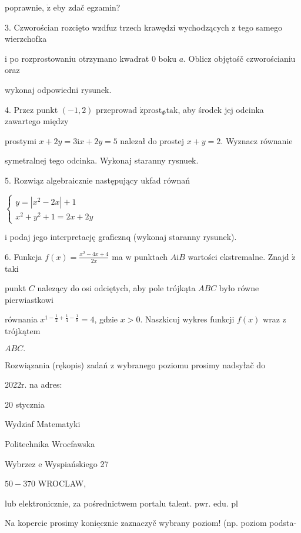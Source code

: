 \documentclass[a4paper,12pt]{article}
\begin{document}
poprawnie, $\dot{\mathrm{z}}$ eby zdač egzamin?

3. Czworościan rozcięto wzdfuz trzech krawędzi wychodzących $\mathrm{z}$ tego samego wierzchofka

$\mathrm{i}$ po rozprostowaniu otrzymano kwadrat $0$ boku $a$. Oblicz objętośč czworościaniu oraz

wykonaj odpowiedni rysunek.

4. Przez punkt $(-1,2)$ przeprowad $\acute{\mathrm{z}} \mathrm{p}\mathrm{r}\mathrm{o}\mathrm{s}\mathrm{t}_{\Phi}\mathrm{t}\mathrm{a}\mathrm{k}$, aby środek jej odcinka zawartego między

prostymi $x+2y = 3\mathrm{i}x+2y = 5$ nalezał do prostej $x+y = 2$. Wyznacz równanie

symetralnej tego odcinka. Wykonaj staranny rysnuek.

5. Rozwiąz algebraicznie następujący ukfad równań

$\left\{\begin{array}{l}
y=|x^{2}-2x|+1\\
x^{2}+y^{2}+1=2x+2y
\end{array}\right.$

$\mathrm{i}$ podaj jego interpretację graficznq (wykonaj staranny rysunek).

6. Funkcja $f(x) = \displaystyle \frac{x^{2}-4x+4}{2x}$ ma $\mathrm{w}$ punktach $A\mathrm{i}B$ wartości ekstremalne. Znajd $\acute{\mathrm{z}}$ taki

punkt $C$ nalezący do osi odciętych, aby pole trójkąta $ABC$ było równe pierwiastkowi

równania $x^{1-\frac{1}{2}+\frac{1}{4}-\frac{1}{8}} =4$, gdzie $x>0$. Naszkicuj wykres funkcji $f(x)$ wraz $\mathrm{z}$ trójkątem

$ABC.$

Rozwiązania (rękopis) zadań z wybranego poziomu prosimy nadsyłač do

2022r. na adres:

20 stycznia

Wydziaf Matematyki

Politechnika Wrocfawska

Wybrzez $\mathrm{e}$ Wyspiańskiego 27

$50-370$ WROCLAW,

lub elektronicznie, za pośrednictwem portalu talent. $\mathrm{p}\mathrm{w}\mathrm{r}$. edu. pl

Na kopercie prosimy $\underline{\mathrm{k}\mathrm{o}\mathrm{n}\mathrm{i}\mathrm{e}\mathrm{c}\mathrm{z}\mathrm{n}\mathrm{i}\mathrm{e}}$ zaznaczyč wybrany poziom! (np. poziom podsta-
\end{document}
